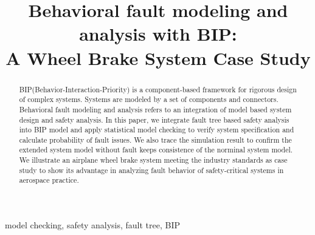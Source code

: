 \documentclass[conference]{IEEEtran}
\begin{document}
\title{Behavioral fault modeling and analysis with BIP:\\
	A Wheel Brake System Case Study\\}

\author{
\and
{}
\and
{}
}

\maketitle

\begin{abstract}
BIP(Behavior-Interaction-Priority) is a component-based framework for rigorous design of complex systems. Systems are modeled by a set of components and connectors.
Behavioral fault modeling and analysis refers to an integration of model based system design and safety analysis. In this paper, we integrate fault tree based safety analysis into BIP model and apply statistical model checking to verify system specification and calculate probability of fault issues. We also trace the simulation result to confirm the extended system model without fault keeps consistence of the norminal system model.  
We illustrate an airplane wheel brake system meeting the industry standards as case study to show its advantage in analyzing fault behavior of safety-critical systems in aerospace practice.
\end{abstract}

\begin{IEEEkeywords}
model checking, safety analysis, fault tree, BIP
\end{IEEEkeywords}
\end{document}
